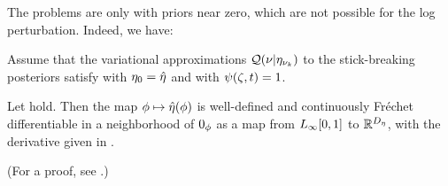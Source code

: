 The problems are only with priors near zero, which are not possible for
the log perturbation.  Indeed, we have:


\begin{assu}
%
Assume that the variational approximations $\mathcal{Q}(\nu \vert \eta_{\nu_{k}})$ to the
stick-breaking posteriors satisfy  with $\eta_0 =
\hat\eta$ and with $\psi(\zeta, t) = 1$.
%
\end{assu}


\begin{thm}
%
Let  hold. Then the map $\phi \mapsto
\hat\eta(\phi)$ is well-defined and continuously Fr{\'e}chet differentiable in a
neighborhood of $0_\phi$ as a map from ${L_{\infty}[0,1]}$ to $\mathbb{R}^{D_{\eta}}$,
with the derivative given in .

(For a proof, see  .)
%

\end{thm}
%
